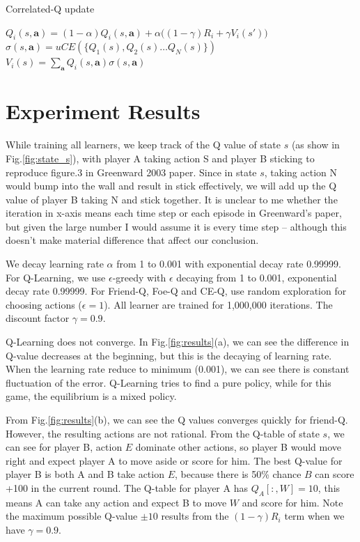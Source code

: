 \documentclass[conference]{IEEEtran}
\begin{document}
\begin{algorithm}[h!]
	\caption{Correlated-Q update}
	\begin{algorithmic}
			\State $Q_i(s, \mathbf{a}) = (1-\alpha) Q_i(s, \mathbf{a}) + \alpha  \big( (1-\gamma) R_i + \gamma V_i(s') \big)$
		\EndFor
		\State $\sigma(s, \mathbf{a}) = uCE(\{Q_1(s), Q_2(s)\dots Q_N(s)\})$ 
		\State $V_i(s) = \sum_{\mathbf{a}} Q_i(s, \mathbf{a}) \sigma(s, \mathbf{a})$
		\EndFor
		\EndFunction
	\end{algorithmic}
	\label{algo:ce-Q}
\end{algorithm}

\section{Experiment Results}
While training all learners, we keep track of the Q value of state $s$ (as show in Fig.\ref{fig:state_s}), with player A taking action S and player B sticking to reproduce figure.3 in Greenward 2003 paper. Since in state $s$, taking action N would bump into the wall and result in stick effectively, we will add up the Q value of player B taking N and stick together. It is unclear to me whether the iteration in x-axis means each time step or each episode in Greenward's paper, but given the large number I would assume it is every time step -- although this doesn't make material difference that affect our conclusion. 

We decay learning rate $\alpha$ from 1 to 0.001 with exponential decay rate 0.99999. For Q-Learning, we use $\epsilon$-greedy with $\epsilon$ decaying from 1 to 0.001, exponential decay rate 0.99999. For Friend-Q, Foe-Q and CE-Q, use random exploration for choosing actions ($\epsilon=1$). All learner are trained for 1,000,000 iterations. The discount factor $\gamma=0.9$.

Q-Learning does not converge. In Fig.\ref{fig:results}(a), we can see the difference in Q-value decreases at the beginning, but this is the decaying of learning rate. When the learning rate reduce to minimum (0.001), we can see there is constant fluctuation of the error. Q-Learning tries to find a pure policy, while for this game, the equilibrium is a mixed policy.

From Fig.\ref{fig:results}(b), we can see the Q values converges quickly for friend-Q. However, the resulting actions are not rational. From the Q-table of state $s$, we can see for player B, action $E$ dominate other actions, so player B would move right and expect player A to move aside or score for him. The best Q-value for player B is both A and B take action $E$, because there is 50\% chance $B$ can score +100 in the current round. The Q-table for player A has $Q_A[:, W]=10$, this means A can take any action and expect B to move $W$ and score for him. Note the maximum possible Q-value $\pm10$ results from the $(1-\gamma)R_i$ term when we have $\gamma=0.9$.
\end{document}
